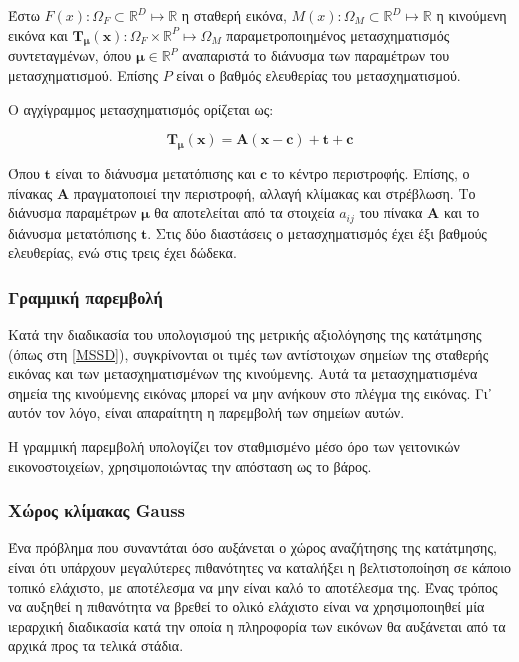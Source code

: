 \documentclass[a4paper,12pt]{article}
\newcommand{\R}{\mathbb{R}}
\begin{document}
Έστω $F(x): \Omega_F \subset \R^D \mapsto \R$ η σταθερή εικόνα, $M(x): \Omega_M
\subset \R^D \mapsto \R$ η κινούμενη εικόνα και $\bm{T_{\mu}}(\bm{x}): \Omega_F
\times \R^P \mapsto \Omega_M$ παραμετροποιημένος μετασχηματισμός συντεταγμένων,
όπου $\bm{\mu} \in \R^P$ αναπαριστά το διάνυσμα των παραμέτρων του
μετασχηματισμού. Επίσης $P$ είναι ο βαθμός ελευθερίας του μετασχηματισμού.

Ο αγχίγραμμος μετασχηματισμός ορίζεται ως:

\begin{equation*}
    \bm{T_{\mu}}(\bm{x}) = \bm{A}(\bm{x} - \bm{c}) + \bm{t} + \bm{c}
\end{equation*}

Όπου $\bm{t}$ είναι το διάνυσμα μετατόπισης και $\bm{c}$ το κέντρο περιστροφής.
Επίσης, ο πίνακας $\bm{A}$ πραγματοποιεί την περιστροφή, αλλαγή κλίμακας και
στρέβλωση. Το διάνυσμα παραμέτρων $\bm{\mu}$ θα αποτελείται από τα στοιχεία
$a_{ij}$ του πίνακα $\bm{A}$ και το διάνυσμα μετατόπισης $\bm{t}$. Στις δύο
διαστάσεις ο μετασχηματισμός έχει έξι βαθμούς ελευθερίας, ενώ στις τρεις έχει
δώδεκα.

\subsubsection{Γραμμική παρεμβολή}

Κατά την διαδικασία του υπολογισμού της μετρικής αξιολόγησης της κατάτμησης
(όπως στη \ref{MSSD}), συγκρίνονται οι τιμές των αντίστοιχων σημείων της
σταθερής εικόνας και των μετασχηματισμένων της κινούμενης. Αυτά τα
μετασχηματισμένα σημεία της κινούμενης εικόνας μπορεί να μην ανήκουν στο πλέγμα
της εικόνας. Γι᾽ αυτόν τον λόγο, είναι απαραίτητη η παρεμβολή των σημείων αυτών.

Η γραμμική παρεμβολή υπολογίζει τον σταθμισμένο μέσο όρο των γειτονικών
εικονοστοιχείων, χρησιμοποιώντας την απόσταση ως το βάρος.

\subsubsection{Χώρος κλίμακας Gauss}

Ένα πρόβλημα που συναντάται όσο αυξάνεται ο χώρος αναζήτησης της κατάτμησης,
είναι ότι υπάρχουν μεγαλύτερες πιθανότητες να καταλήξει η βελτιστοποίηση σε
κάποιο τοπικό ελάχιστο, με αποτέλεσμα να μην είναι καλό το αποτέλεσμα της. Ένας
τρόπος να αυξηθεί η πιθανότητα να βρεθεί το ολικό ελάχιστο είναι να
χρησιμοποιηθεί μία ιεραρχική διαδικασία κατά την οποία η πληροφορία των εικόνων
θα αυξάνεται από τα αρχικά προς τα τελικά στάδια. 
\end{document}

